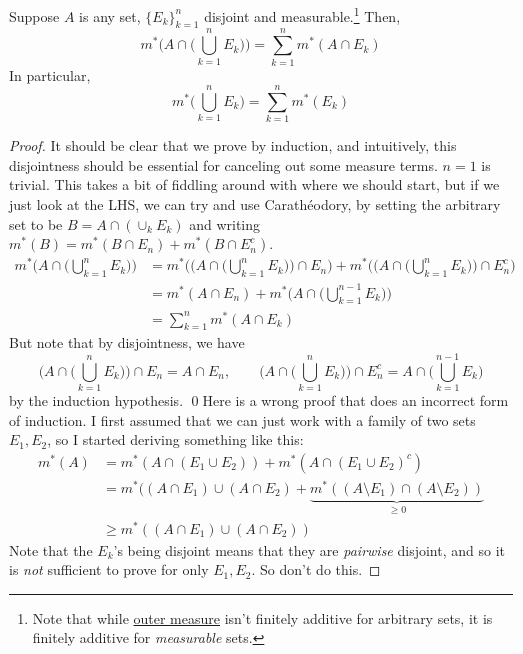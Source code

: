   \begin{lemma}
    \label{thm:finite-additivity-of-outer-measure-for}
    Suppose $A$ is any set, $\{E_k\}_{k=1}^n$ disjoint and measurable.\footnote{Note that while \hyperref[def:outer-measure]{outer measure} isn't finitely additive for arbitrary sets, it is finitely additive for \textit{measurable} sets.} Then, 
    \begin{equation}
      m^\ast \bigg( A \cap \Big( \bigcup_{k=1}^n E_k \Big) \bigg) = \sum_{k=1}^n m^\ast (A \cap E_k)
    \end{equation}
    In particular, 
    \begin{equation}
      m^\ast \bigg( \bigcup_{k=1}^n E_k \bigg) = \sum_{k=1}^n m^\ast (E_k)
    \end{equation}
  \end{lemma}
  \begin{proof}
    It should be clear that we prove by induction, and intuitively, this disjointness should be essential for canceling out some measure terms. $n = 1$ is trivial. This takes a bit of fiddling around with where we should start, but if we just look at the LHS, we can try and use Carathéodory, by setting the arbitrary set to be $B = A \cap (\cup_{k} E_k)$ and  writing $m^\ast (B) = m^\ast(B \cap E_n) + m^\ast(B \cap E_n^c)$. 
    \begin{align}
      m^\ast \bigg( A \cap \Big( \bigcup_{k=1}^n E_k \Big) \bigg) 
        & = m^\ast \Bigg( \bigg( A \cap \Big( \bigcup_{k=1}^n E_k \Big) \bigg) \cap E_n \Bigg) + m^\ast \Bigg( \bigg( A \cap \Big( \bigcup_{k=1}^n E_k \Big) \bigg) \cap E_n^c \Bigg) \\  
        & = m^\ast (A \cap E_n) + m^\ast \bigg( A \cap \Big( \bigcup_{k=1}^{n-1} E_k \Big) \bigg) \\ 
        & = \sum_{k=1}^n m^\ast (A \cap E_k)
    \end{align}
    But note that by disjointness, we have 
    \begin{equation}
      \bigg( A \cap \Big( \bigcup_{k=1}^n E_k \Big) \bigg) \cap E_n = A \cap E_n, \qquad \bigg( A \cap \Big( \bigcup_{k=1}^n E_k \Big) \bigg) \cap E_n^c = A \cap \Big( \bigcup_{k=1}^{n-1} E_k \Big)
    \end{equation}
    by the induction hypothesis. \qed Here is a wrong proof that does an incorrect form of induction. I first assumed that we can just work with a family of two sets $E_1, E_2$, so I started deriving something like this: 
    \begin{align}
      m^\ast(A) & = m^\ast (A \cap (E_1 \cup E_2)) + m^\ast (A \cap (E_1 \cup E_2)^c ) \\ 
                & = m^\ast ((A \cap E_1) \cup (A \cap E_2) + \underbrace{m^\ast ((A \setminus E_1) \cap (A \setminus E_2))}_{\geq 0} \\ 
                & \geq m^\ast ((A \cap E_1) \cup (A \cap E_2)) 
    \end{align}
    Note that the $E_k$'s being disjoint means that they are \textit{pairwise} disjoint, and so it is \textit{not} sufficient to prove for only $E_1, E_2$. So don't do this. 
  \end{proof}


